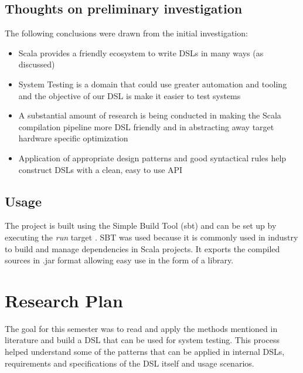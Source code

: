 \documentclass[12 pt]{article}
\begin{document}
\subsection{Thoughts on preliminary investigation}
The following conclusions were drawn from the initial investigation:
\begin{itemize}
\item Scala provides a friendly ecosystem to write DSLs in many ways (as discussed)
\item System Testing is a domain that could use greater automation and tooling and the objective of our DSL is make it easier to test systems
\item A substantial amount of research is being conducted in making the Scala compilation pipeline more DSL friendly and in abstracting away target hardware specific optimization
\item Application of appropriate design patterns and good syntactical rules help construct DSLs with a clean, easy to use API
\end{itemize}


\subsection{Usage}
The project is built using the Simple Build Tool (sbt) and can be set up by executing the \textit{run} target \cite{sbt}. SBT was used because it is commonly used in industry to build and manage dependencies in Scala projects. It exports the compiled sources in .jar format allowing easy use in the form of a library.

\newpage
\section{Research Plan}
The goal for this semester was to read and apply the methods mentioned in literature and build a DSL that can be used for system testing. This process helped understand some of the patterns that can be applied in internal DSLs, requirements and specifications of the DSL itself and usage scenarios.
\bigskip
\end{document}
